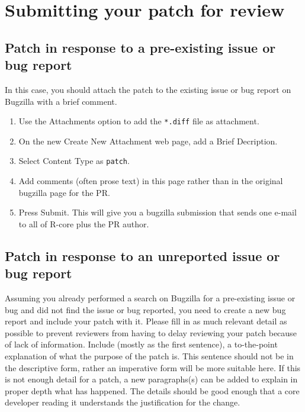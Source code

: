 \documentclass[
]{book}
\begin{document}
\section{Submitting your patch for review}\label{SubmitPatches}

\subsection{Patch in response to a pre-existing issue or bug report}\label{patch-in-response-to-a-pre-existing-issue-or-bug-report}

In this case, you should attach the patch to the existing issue or bug report on Bugzilla with a brief comment.

\begin{enumerate}
\def\labelenumi{\arabic{enumi}.}
\item
  Use the Attachments option to add the \texttt{*.diff} file as attachment.
\item
  On the new Create New Attachment web page, add a Brief Decription.
\item
  Select Content Type as \texttt{patch}.
\item
  Add comments (often prose text) in this page rather than in the original bugzilla page for the PR.
\item
  Press Submit. This will give you a bugzilla submission that sends one e-mail to all of R-core plus the PR author.
\end{enumerate}

\subsection{Patch in response to an unreported issue or bug report}\label{patch-in-response-to-an-unreported-issue-or-bug-report}

Assuming you already performed a search on Bugzilla for a pre-existing issue or bug and did not find the issue or bug reported, you need to create a new bug report and include your patch with it. Please fill in as much relevant detail as possible to prevent reviewers from having to delay reviewing your patch because of lack of information. Include (mostly as the first sentence), a to-the-point explanation of what the purpose of the patch is. This sentence should not be in the descriptive form, rather an imperative form will be more suitable here. If this is not enough detail for a patch, a new paragraphs(s) can be added to explain in proper depth what has happened. The details should be good enough that a core developer reading it understands the justification for the change.
\end{document}
